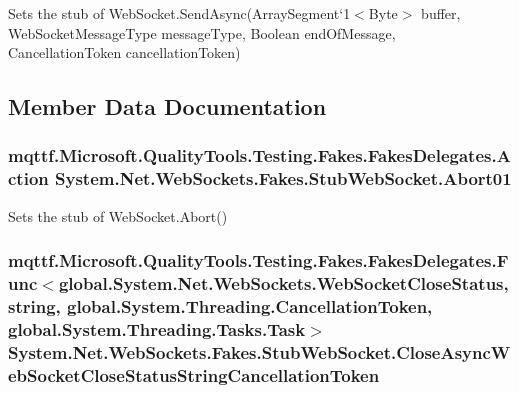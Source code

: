 Sets the stub of Web\-Socket.\-Send\-Async(Array\-Segment`1$<$Byte$>$ buffer, Web\-Socket\-Message\-Type message\-Type, Boolean end\-Of\-Message, Cancellation\-Token cancellation\-Token)



\subsection{Member Data Documentation}
\hypertarget{class_system_1_1_net_1_1_web_sockets_1_1_fakes_1_1_stub_web_socket_ac7a1e0526e713fc41d5e5649e8425e19}{
\subsubsection[{Abort01}]{\setlength{\rightskip}{0pt plus 5cm}mqttf.\-Microsoft.\-Quality\-Tools.\-Testing.\-Fakes.\-Fakes\-Delegates.\-Action System.\-Net.\-Web\-Sockets.\-Fakes.\-Stub\-Web\-Socket.\-Abort01}}\label{class_system_1_1_net_1_1_web_sockets_1_1_fakes_1_1_stub_web_socket_ac7a1e0526e713fc41d5e5649e8425e19}


Sets the stub of Web\-Socket.\-Abort()

\hypertarget{class_system_1_1_net_1_1_web_sockets_1_1_fakes_1_1_stub_web_socket_a80c223a9ef0c5ce77d7ebf9132eef51c}{
\subsubsection[{Close\-Async\-Web\-Socket\-Close\-Status\-String\-Cancellation\-Token}]{\setlength{\rightskip}{0pt plus 5cm}mqttf.\-Microsoft.\-Quality\-Tools.\-Testing.\-Fakes.\-Fakes\-Delegates.\-Func$<$global.\-System.\-Net.\-Web\-Sockets.\-Web\-Socket\-Close\-Status, string, global.\-System.\-Threading.\-Cancellation\-Token, global.\-System.\-Threading.\-Tasks.\-Task$>$ System.\-Net.\-Web\-Sockets.\-Fakes.\-Stub\-Web\-Socket.\-Close\-Async\-Web\-Socket\-Close\-Status\-String\-Cancellation\-Token}}\label{class_system_1_1_net_1_1_web_sockets_1_1_fakes_1_1_stub_web_socket_a80c223a9ef0c5ce77d7ebf9132eef51c}


